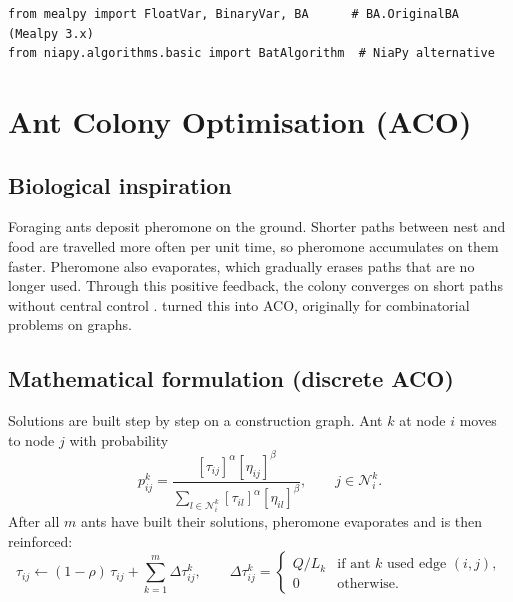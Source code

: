 \documentclass[11pt,a4paper]{article}
\begin{document}
\begin{lstlisting}
from mealpy import FloatVar, BinaryVar, BA      # BA.OriginalBA (Mealpy 3.x)
from niapy.algorithms.basic import BatAlgorithm  # NiaPy alternative
\end{lstlisting}

\section{Ant Colony Optimisation (ACO)}
\label{sec:aco}

\subsection{Biological inspiration}

Foraging ants deposit pheromone on the ground. Shorter paths between nest and food are travelled more often per unit time, so pheromone accumulates on them faster. Pheromone also evaporates, which gradually erases paths that are no longer used. Through this positive feedback, the colony converges on short paths without central control \citep{goss1989}. \citet{dorigo1992} turned this into ACO, originally for combinatorial problems on graphs.

\subsection{Mathematical formulation (discrete ACO)}

Solutions are built step by step on a construction graph. Ant $k$ at node $i$ moves to node $j$ with probability
\begin{equation}
  p_{ij}^{k} = \frac{\left[ \tau_{ij} \right]^{\alpha} \left[ \eta_{ij} \right]^{\beta}}{\sum_{l \in \mathcal{N}_i^{k}} \left[ \tau_{il} \right]^{\alpha} \left[ \eta_{il} \right]^{\beta}}, \qquad j \in \mathcal{N}_i^{k}.
\end{equation}
After all $m$ ants have built their solutions, pheromone evaporates and is then reinforced:
\begin{equation}
  \tau_{ij} \leftarrow (1 - \rho) \, \tau_{ij} + \sum_{k=1}^{m} \Delta \tau_{ij}^{k}, \qquad
  \Delta \tau_{ij}^{k} =
  \begin{cases}
    Q / L_k & \text{if ant } k \text{ used edge } (i,j), \\
    0 & \text{otherwise}.
  \end{cases}
\end{equation}
\end{document}
